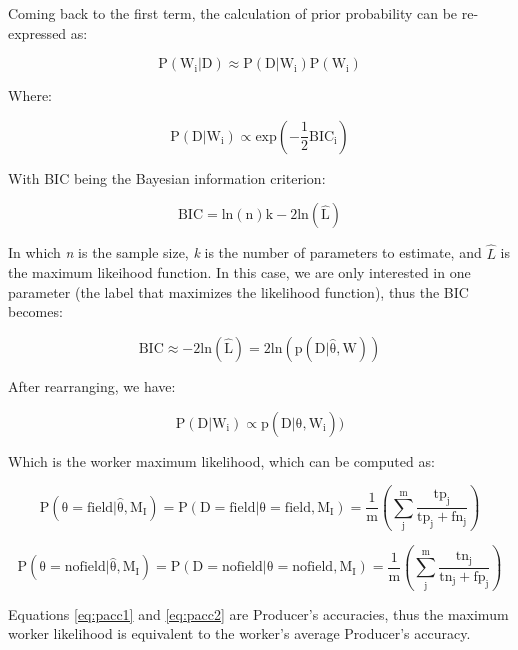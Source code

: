 \documentclass[
  11pt,
  a4paper]{article}
\begin{document}
Coming back to the first term, the calculation of prior probability can
be re-expressed as:

\begin{equation} \label{eq:prior}
\mathrm{P(W_i|D) \approx P(D|W_i)P(W_i)}
\end{equation}

Where:

\begin{equation} 
\mathrm{P(D|W_i) \propto exp\left(-\frac{1}{2}BIC_i\right)}
\end{equation}

With BIC being the Bayesian information criterion:

\begin{equation}
\mathrm{BIC = ln(n)k - 2ln(\hat{L})}
\end{equation}

In which \emph{n} is the sample size, \emph{k} is the number of
parameters to estimate, and \(\hat{L}\) is the maximum likeihood
function. In this case, we are only interested in one parameter (the
label that maximizes the likelihood function), thus the BIC becomes:

\begin{equation}
\mathrm{BIC \approx -2ln(\hat{L}) = 2ln(p(D|\hat{\theta}, W))}
\end{equation}

After rearranging, we have:

\begin{equation}
\mathrm{P(D|W_i) \propto p(D|\hat{\theta}, W_i))}
\end{equation}

Which is the worker maximum likelihood, which can be computed as:

\begin{equation} \label{eq:pacc1}
\mathrm{P(\theta = field|\hat{\theta}, M_I) = P(D = field|\theta = field, M_I) = \frac{1}{m}\left(\sum_{j}^{m}\frac{tp_j}{tp_j + fn_j} \right)}
\end{equation}

\begin{equation} \label{eq:pacc2}
\mathrm{P(\theta = no field|\hat{\theta}, M_I) = P(D = no field|\theta = no field, M_I) = \frac{1}{m}\left(\sum_{j}^{m}\frac{tn_j}{tn_j + fp_j} \right)}
\end{equation}

Equations \ref{eq:pacc1} and \ref{eq:pacc2} are Producer's accuracies,
thus the maximum worker likelihood is equivalent to the worker's average
Producer's accuracy.
\end{document}
